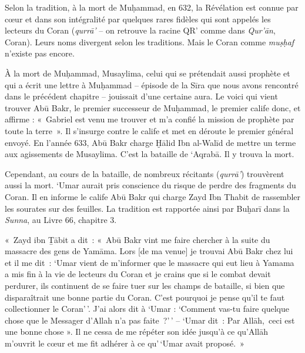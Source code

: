 Selon la tradition, à la mort de Muḥammad, en 632, la Révélation est
connue par cœur et dans son intégralité par quelques rares fidèles qui
sont appelés les lecteurs du Coran (\emph{qurrā'} -- on retrouve la
racine QR' comme dans \emph{Qur'ān}, Coran). Leurs noms divergent selon
les traditions. Mais le Coran comme \emph{muṣḥaf} n'existe pas encore.

À la mort de Muḥammad, Musaylima, celui qui se prétendait aussi prophète
et qui a écrit une lettre à Muḥammad -- épisode de la Sīra que nous
avons rencontré dans le précédent chapitre -- jouissait d'une certaine
aura. Le voici qui vient trouver Abū Bakr, le premier successeur de
Muḥammad, le premier calife donc, et affirme : «~Gabriel est venu me
trouver et m'a confié la mission de prophète par toute la terre~». Il
s'insurge contre le calife et met en déroute le premier général envoyé.
En l'année 633, Abū Bakr charge Ḫālid Ibn al-Walīd de mettre un terme
aux agissements de Musaylima. C'est la bataille de `Aqrabā. Il y trouva
la mort.

Cependant, au cours de la bataille, de nombreux récitants
(\emph{qurrā'}) trouvèrent aussi la mort. `Umar aurait pris conscience
du risque de perdre des fragments du Coran. Il en informe le calife Abū
Bakr qui charge Zayd Ibn Thabit de rassembler les sourates sur des
feuilles. La tradition est rapportée ainsi par Buḫarī dans la
\emph{Sunna}, au Livre 66, chapitre 3.

«~Zayd ibn Ṯābit a dit~: «~Abū Bakr vint me faire chercher à la suite du
massacre des gens de Yamāma. Lors {[}de ma venue{]} je trouvai Abū Bakr
chez lui et il me dit~: `Umar vient de m'informer que le massacre qui
eut lieu à Yamama a mis fin à la vie de lecteurs du Coran et je crains
que si le combat devait perdurer, ils continuent de se faire tuer sur
les champs de bataille, si bien que disparaîtrait une bonne partie du
Coran. C'est pourquoi je pense qu'il te faut collectionner le Coran'\,'.
J'ai alors dit à `Umar : `Comment vas-tu faire quelque chose que le
Messager d'Allah n'a pas faite~?'\,' -- `Umar dit~: Par Allāh,~ceci est
une bonne chose ». Il ne cessa de me répéter son idée jusqu'à ce
qu'Allāh m'ouvrit le cœur et me fit adhérer à ce qu'\,`Umar avait
proposé.~»

